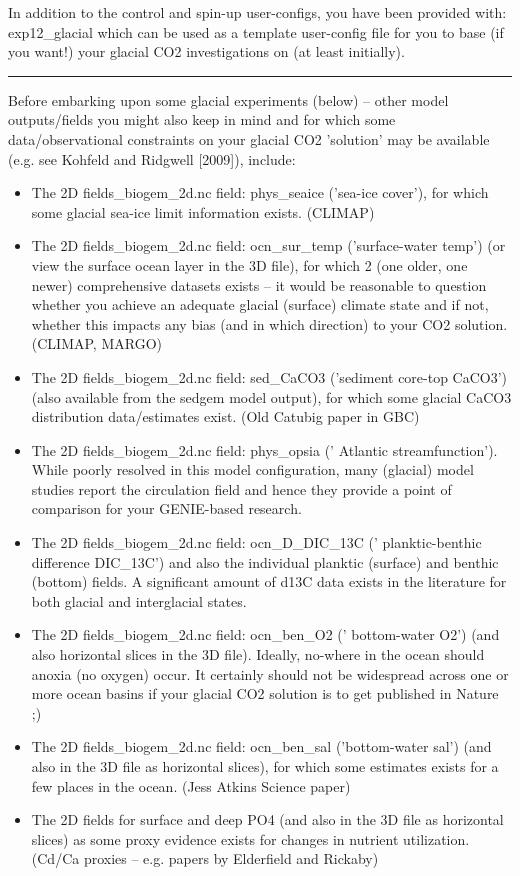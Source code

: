 \documentclass[11pt,fleqn]{book} %
\begin{document}
In addition to the control and spin-up user-configs, you have been provided with: exp12\_glacial which can be used as a template user-config file for you to base (if you want!) your glacial CO2 investigations on (at least initially).

\vspace{1mm}
\noindent\rule{4cm}{0.5pt}
\vspace{2mm}

Before embarking upon some glacial experiments (below) – other model outputs/fields you might
also keep in mind and for which some data/observational constraints on your glacial CO2 'solution'
may be available (e.g. see Kohfeld and Ridgwell [2009]), include:

\begin{itemize}
        \item
The 2D fields\_biogem\_2d.nc field: phys\_seaice ('sea-ice cover'), for which some glacial
sea-ice limit information exists. (CLIMAP)
        \item
The 2D fields\_biogem\_2d.nc field: ocn\_sur\_temp ('surface-water temp') (or view the
surface ocean layer in the 3D file), for which 2 (one older, one newer) comprehensive
datasets exists -- it would be reasonable to question whether you achieve an adequate
glacial (surface) climate state and if not, whether this impacts any bias (and in which
direction) to your CO2 solution. (CLIMAP, MARGO)
        \item
The 2D fields\_biogem\_2d.nc field: sed\_CaCO3 ('sediment core-top CaCO3') (also
available from the sedgem model output), for which some glacial CaCO3 distribution
data/estimates exist. (Old Catubig paper in GBC)
        \item
The 2D fields\_biogem\_2d.nc field: phys\_opsia (' Atlantic streamfunction'). While poorly
resolved in this model configuration, many (glacial) model studies report the circulation field
and hence they provide a point of comparison for your GENIE-based research.
        \item
The 2D fields\_biogem\_2d.nc field: ocn\_D\_DIC\_13C (' planktic-benthic difference
DIC\_13C') and also the individual planktic (surface) and benthic (bottom) fields. A
significant amount of d13C data exists in the literature for both glacial and interglacial states.
        \item
The 2D fields\_biogem\_2d.nc field: ocn\_ben\_O2 (' bottom-water O2') (and also horizontal
slices in the 3D file). Ideally, no-where in the ocean should anoxia (no oxygen) occur. It
certainly should not be widespread across one or more ocean basins if your glacial CO2
solution is to get published in Nature ;)
        \item
The 2D fields\_biogem\_2d.nc field: ocn\_ben\_sal ('bottom-water sal') (and also in the 3D
file as horizontal slices), for which some estimates exists for a few places in the ocean.
(Jess Atkins Science paper)
        \item
The 2D fields for surface and deep PO4 (and also in the 3D file as horizontal slices) as
some proxy evidence exists for changes in nutrient utilization. (Cd/Ca proxies – e.g. papers
by Elderfield and Rickaby)

\end{itemize}
\end{document}
